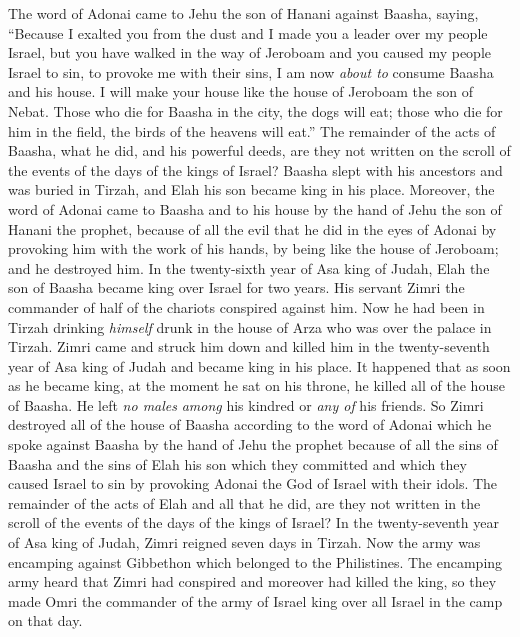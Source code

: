 \begin{biblechapter} %
\verse The word of Adonai came to Jehu the son of Hanani against Baasha, saying,
\verse “Because I exalted you from the dust and I made you a leader over my people Israel, but you have walked in the way of Jeroboam and you caused my people Israel to sin, to provoke me with their sins,
\verse I am now \textit{about to} consume Baasha and his house. I will make your house like the house of Jeroboam the son of Nebat.
\verse Those who die for Baasha in the city, the dogs will eat; those who die for him in the field, the birds of the heavens will eat.”
\verse The remainder of the acts of Baasha, what he did, and his powerful deeds, are they not written on the scroll of the events of the days of the kings of Israel?
\verse Baasha slept with his ancestors and was buried in Tirzah, and Elah his son became king in his place.
\verse Moreover, the word of Adonai came to Baasha and to his house by the hand of Jehu the son of Hanani the prophet, because of all the evil that he did in the eyes of Adonai by provoking him with the work of his hands, by being like the house of Jeroboam; and he destroyed him.
 In the twenty-sixth year of Asa king of Judah, Elah the son of Baasha became king over Israel for two years.
\verse His servant Zimri the commander of half of the chariots conspired against him. Now he had been in Tirzah drinking \textit{himself} drunk in the house of Arza who was over the palace in Tirzah.
\verse Zimri came and struck him down and killed him in the twenty-seventh year of Asa king of Judah and became king in his place.
\verse It happened that as soon as he became king, at the moment he sat on his throne, he killed all of the house of Baasha. He left \textit{no males} \textit{among} his kindred or \textit{any of} his friends.
\verse So Zimri destroyed all of the house of Baasha according to the word of Adonai which he spoke against Baasha by the hand of Jehu the prophet
\verse because of all the sins of Baasha and the sins of Elah his son which they committed and which they caused Israel to sin by provoking Adonai the God of Israel with their idols.
\verse The remainder of the acts of Elah and all that he did, are they not written in the scroll of the events of the days of the kings of Israel?
 In the twenty-seventh year of Asa king of Judah, Zimri reigned seven days in Tirzah. Now the army was encamping against Gibbethon which belonged to the Philistines.
\verse The encamping army heard that Zimri had conspired and moreover had killed the king, so they made Omri the commander of the army of Israel king over all Israel in the camp on that day.

\end{biblechapter}
